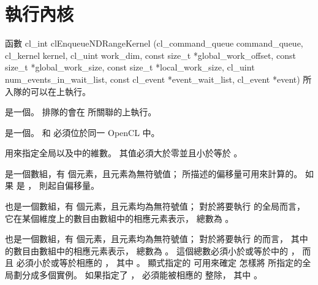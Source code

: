 \section{執行內核}

函數
\startclc
cl_int clEnqueueNDRangeKernel (cl_command_queue command_queue,
			cl_kernel kernel,
			cl_uint work_dim,
			const size_t *global_work_offset,
			const size_t *global_work_size,
			const size_t *local_work_size,
			cl_uint num_events_in_wait_list,
			const cl_event *event_wait_list,
			cl_event *event)
\stopclc
所入隊的可以在上執行。

 是一個。
排隊的會在  所關聯的上執行。

 是一個。
  和  必須位於同一 OpenCL 中。

 用來指定全局以及中的維數。
其值必須大於零並且小於等於 。

 是一個數組，有  個元素，且元素為無符號值；
所描述的偏移量可用來計算的。
如果  是 ，
則起自偏移量。

 也是一個數組，有  個元素，且元素均為無符號值；
對於將要執行  的全局而言，
它在某個維度上的數目由數組中的相應元素表示，
總數為 。

 也是一個數組，有  個元素，且元素均為無符號值；
對於將要執行  的而言，
其中的數目由數組中的相應元素表示，
總數為 。
這個總數必須小於或等於中的 ，
而且  必須小於或等於相應的
 ，
其中 。
顯式指定的  可用來確定
怎樣將  所指定的全局劃分成多個實例。
如果指定了 ，
  必須能被相應的
  整除，
其中 。

